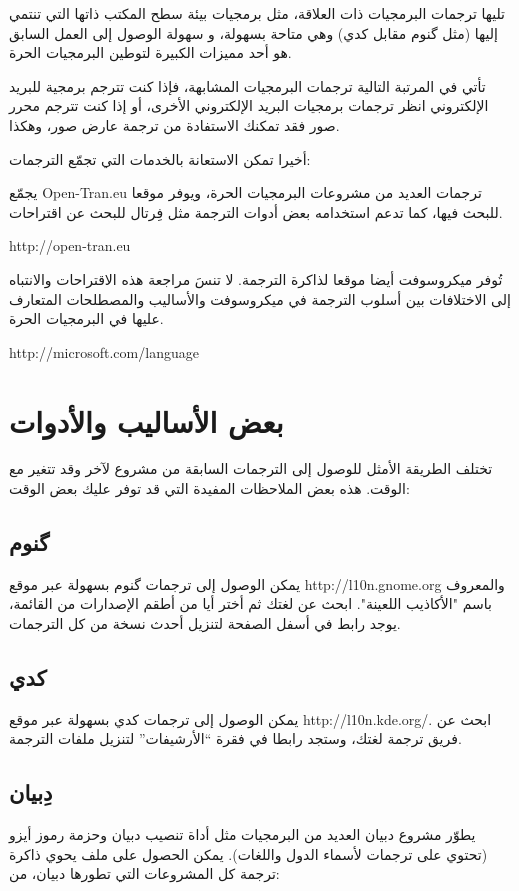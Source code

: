 تليها ترجمات البرمجيات ذات العلاقة، مثل برمجيات بيئة سطح المكتب ذاتها
التي تنتمي إليها (مثل گنوم مقابل كدي) وهي متاحة بسهولة، و سهولة الوصول
إلى العمل السابق هو أحد مميزات الكبيرة لتوطين البرمجيات الحرة.

تأتي في المرتبة التالية ترجمات البرمجيات المشابهة، فإذا كنت تترجم برمجية
للبريد الإلكتروني انظر ترجمات برمجيات البريد الإلكتروني الأخرى، أو إذا
كنت تترجم محرر صور فقد تمكنك الاستفادة من ترجمة عارض صور، وهكذا.

أخيرا تمكن الاستعانة بالخدمات التي تجمّع الترجمات:

\startitemize[1]
\item يجمّع Open-Tran.eu ترجمات العديد من مشروعات البرمجيات الحرة، ويوفر
موقعا للبحث فيها، كما تدعم استخدامه بعض أدوات الترجمة مثل فِرتال للبحث
عن اقتراحات.

 http://open-tran.eu 
\item تُوفر ميكروسوفت أيضا موقعا لذاكرة الترجمة. لا تنسَ مراجعة هذه
الاقتراحات والانتباه إلى الاختلافات بين أسلوب الترجمة في ميكروسوفت
والأساليب والمصطلحات المتعارف عليها في البرمجيات الحرة.

 http://microsoft.com/language
\stopitemize
\section{بعض الأساليب والأدوات}
تختلف الطريقة الأمثل للوصول إلى الترجمات السابقة من مشروع لآخر وقد تتغير
مع الوقت. هذه بعض الملاحظات المفيدة التي قد توفر عليك بعض الوقت:

\subsection{گنوم}
يمكن الوصول إلى ترجمات گنوم بسهولة عبر موقع http://l10n.gnome.org
والمعروف باسم "الأكاذيب اللعينة". ابحث عن لغتك ثم أختر أيا من أطقم
الإصدارات من القائمة، يوجد رابط في أسفل الصفحة لتنزيل أحدث نسخة من كل
الترجمات.

\subsection{كدي}
يمكن الوصول إلى ترجمات كدي بسهولة عبر موقع http://l10n.kde.org/. ابحث عن
فريق ترجمة لغتك، وستجد رابطا في فقرة “الأرشيفات” لتنزيل ملفات الترجمة.

\subsection{دِبيان}
يطوّر مشروع دبيان العديد من البرمجيات مثل أداة تنصيب دبيان وحزمة رموز
أيزو (تحتوي على ترجمات لأسماء الدول واللغات). يمكن الحصول على ملف يحوي
ذاكرة ترجمة كل المشروعات التي تطورها دبيان، من:

